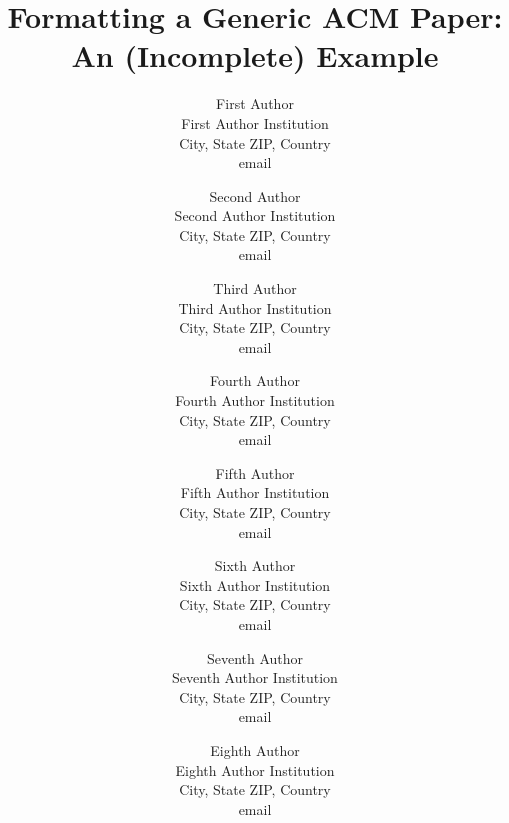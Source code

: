 \documentclass[letterpaper,twocolumn,draft]{article}
\begin{document}
\title{
    Formatting a Generic ACM Paper:\\
    An (Incomplete) Example}
\date{}
\author{
    First Author\\
    First Author Institution\\
    City, State ZIP, Country\\
    email\\
    \and
    Second Author\\
    Second Author Institution\\
    City, State ZIP, Country\\
    email\\
    \and
    Third Author\\
    Third Author Institution\\
    City, State ZIP, Country\\
    email\\
    \and
    Fourth Author\\
    Fourth Author Institution\\
    City, State ZIP, Country\\
    email\\
    \and
    Fifth Author\\
    Fifth Author Institution\\
    City, State ZIP, Country\\
    email\\
    \and
    Sixth Author\\
    Sixth Author Institution\\
    City, State ZIP, Country\\
    email\\
    \and
    Seventh Author\\
    Seventh Author Institution\\
    City, State ZIP, Country\\
    email\\
    \and
    Eighth Author\\
    Eighth Author Institution\\
    City, State ZIP, Country\\
    email\\}
\maketitle

\end{document}
